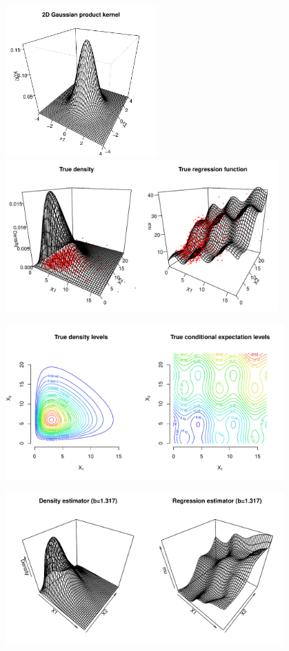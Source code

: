 \documentclass[11pt, a4paper]{article}
\begin{document}
\begin{center}
	\includegraphics[height=5.8cm]{output/20-kernel.pdf}\includegraphics[height=5.8cm]{output/21-theoretical-values-3d.pdf}
	
	\includegraphics[width=0.8\textwidth]{output/22-theoretical-values-2d.pdf}
		
	\includegraphics[width=0.8\textwidth]{output/23-estimator.pdf}
	

\end{center}
\end{document}
